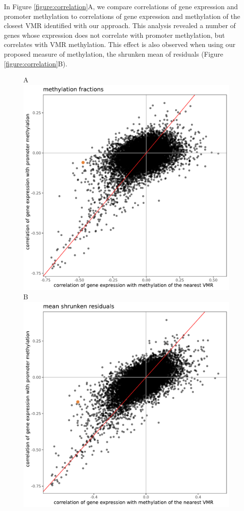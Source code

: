 \documentclass[twocolumn,10pt]{article}
\begin{document}
In Figure \ref{figure:correlation}A, we compare correlations of gene expression and promoter methylation to correlations of gene expression and methylation of the closest VMR identified with our approach.
This analysis revealed a number of genes whose expression does not correlate with promoter methylation, but correlates with VMR methylation.
This effect is also observed when using our proposed measure of methylation, the shrunken mean of residuals (Figure \ref{figure:correlation}B).

\begin{figure}
    \begin{center}
    A\hspace{.9\columnwidth}~\\
    \includegraphics[width=.7\columnwidth]{part_leonie_git/leonie_plots/corr_methylation_fraction_4kbwindow.pdf} \\
    B\hspace{.9\columnwidth}~\\
    \includegraphics[width=.7\columnwidth]{part_leonie_git/leonie_plots/corr_shrunken_residual_4kbwindow.pdf} \\

\end{center}
\end{figure}
\end{document}
